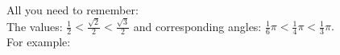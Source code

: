 \documentclass[preview]{standalone}
\begin{document}
\begin{center}
All you need to remember: \\ The values: $\frac{1}{2} < \frac{\sqrt{2}}{2} < \frac{\sqrt{3}}{2}$ and corresponding angles: $ \frac{1}{6} \pi < \frac{1}{4} \pi < \frac{1}{3} \pi. $ \\ For example:
\end{center}
\end{document}

